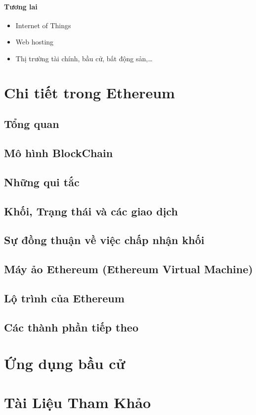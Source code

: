 \documentclass[12pt]{article}
\begin{document}
		\paragraph{Tương lai}
		\begin{itemize}
			\item Internet of Things
			
			\item Web hosting
			
			\item Thị trường tài chính, bầu cử, bất động sản,…
			
			
		\end{itemize}
	\newpage
	
	\section{Chi tiết trong Ethereum}
	
	\subsection{Tổng quan}
	
	\subsection{Mô hình BlockChain}
	
	\subsection{Những qui tắc}
	
	\subsection{Khối, Trạng thái và các giao dịch}
	
	
	\subsection{Sự đồng thuận về việc chấp nhận khối}
	
	\subsection{Máy ảo Ethereum (Ethereum Virtual Machine)}
	
	
	\subsection{Lộ trình của Ethereum}
	
	
	\subsection{Các thành phần tiếp theo}
	
	
	\section{Ứng dụng bầu cử}
	
	\section{Tài Liệu Tham Khảo}
	
\end{document}
